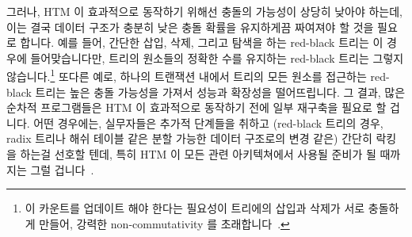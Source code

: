 \fi

그러나, HTM 이 효과적으로 동작하기 위해선 충돌의 가능성이 상당히 낮아야 하는데,
이는 결국 데이터 구조가 충분히 낮은 충돌 확률을 유지하게끔 짜여져야 할 것을
필요로 합니다.
예를 들어, 간단한 삽입, 삭제, 그리고 탐색을 하는 red-black 트리는 이 경우에
들어맞습니다만, 트리의 원소들의 정확한 수를 유지하는 red-black 트리는 그렇지
않습니다.\footnote{
	이 카운트를 업데이트 해야 한다는 필요성이 트리에의 삽입과 삭제가 서로
	충돌하게 만들어, 강력한 non-commutativity 를
	초래합니다~\cite{HagitAttiya2011LawsOfOrder,Attiya:2011:LOE:1925844.1926442,PaulEMcKenney2011SNC}.}
또다른 예로, 하나의 트랜잭션 내에서 트리의 모든 원소를 접근하는 red-black
트리는 높은 충돌 가능성을 가져서 성능과 확장성을 떨어뜨립니다.
그 결과, 많은 순차적 프로그램들은 HTM 이 효과적으로 동작하기 전에 일부 재구축을
필요로 할 겁니다.
어떤 경우에는, 실무자들은 추가적 단계들을 취하고 (red-black 트리의 경우, radix
트리나 해쉬 테이블 같은 분할 가능한 데이터 구조로의 변경 같은) 간단히 락킹을
하는걸 선호할 텐데, 특히 HTM 이 모든 관련 아키텍쳐에서 사용될 준비가 될
때까지는 그럴 겁니다~\cite{CliffClick2009AzulHTM}.

\iffalse

However, for HTM to work effectively, the probability of conflict must
be quite low, which in turn requires that the data structures
be organized so as to maintain a sufficiently low probability of conflict.
For example, a red-black tree with simple insertion, deletion, and search
operations fits this description, but a red-black
tree that maintains an accurate count of the number of elements in
the tree does not.\footnote{
	The need to update the count would result in additions to and
	deletions from the tree conflicting with each other, resulting
	in strong non-commutativity~\cite{HagitAttiya2011LawsOfOrder,Attiya:2011:LOE:1925844.1926442,PaulEMcKenney2011SNC}.}
For another example, a red-black tree that enumerates all elements in
the tree in a single transaction will have high conflict probabilities,
degrading performance and scalability.
As a result, many serial programs will require some restructuring before
HTM can work effectively.
In some cases, practitioners will prefer to take the extra steps
(in the red-black-tree case, perhaps switching to a partitionable
data structure such as a radix tree or a hash table), and just
use locking, particularly until such time as HTM is readily available
on all relevant
architectures~\cite{CliffClick2009AzulHTM}.

\fi

